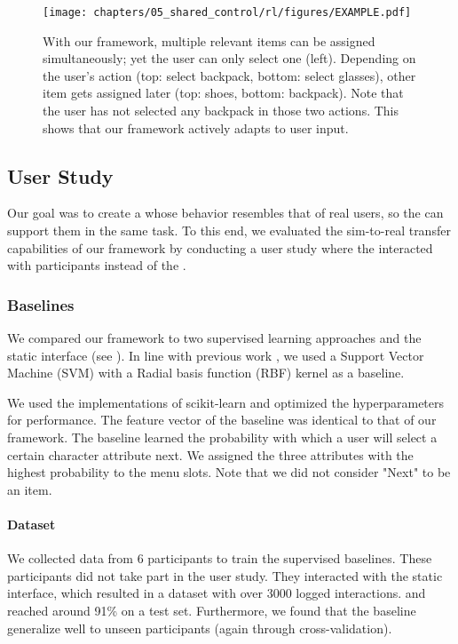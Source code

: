\begin{figure}[!t]
    \centering
    \texttt{[image: chapters/05\_shared\_control/rl/figures/EXAMPLE.pdf]}
    \caption{With our framework, multiple relevant items can be assigned simultaneously; yet the user can only select one (left). Depending on the user's action (top: select backpack, bottom: select glasses), other item gets assigned later (top: shoes, bottom: backpack). Note that the user has not selected any backpack in those two actions. This shows that our framework actively adapts to user input.}
    \label{fig:sequence}
\end{figure}

\subsection{User Study}
\label{sec:userstudy}
Our goal was to create a \useragent whose behavior resembles that of real users, so the \interfaceagent can support them in the same task. To this end, we evaluated the sim-to-real transfer capabilities of our framework by conducting a user study where the \interfaceagent interacted with participants instead of the \useragent.

\subsubsection{Baselines}
We compared our framework to two supervised learning approaches and the static interface (see ).
In line with previous work \cite{gebhardt2019learning}, we used a Support Vector Machine (SVM) with a Radial basis function (RBF) kernel as a baseline. 

We used the implementations of scikit-learn \cite{scikit-learn} and optimized the hyperparameters for performance. The feature vector of the baseline was identical to that of our framework. The baseline learned the probability with which a user will select a certain character attribute next. We assigned the three attributes with the highest probability to the menu slots. Note that we did not consider "Next" to be an item. 

\paragraph{Dataset} We collected data from 6 participants to train the supervised baselines. These participants did not take part in the user study. They interacted with the static interface, which resulted in a dataset with over 3000 logged interactions.  and reached around 91\%  on a test set. Furthermore, we found that the baseline generalize well to unseen participants (again through cross-validation).  


